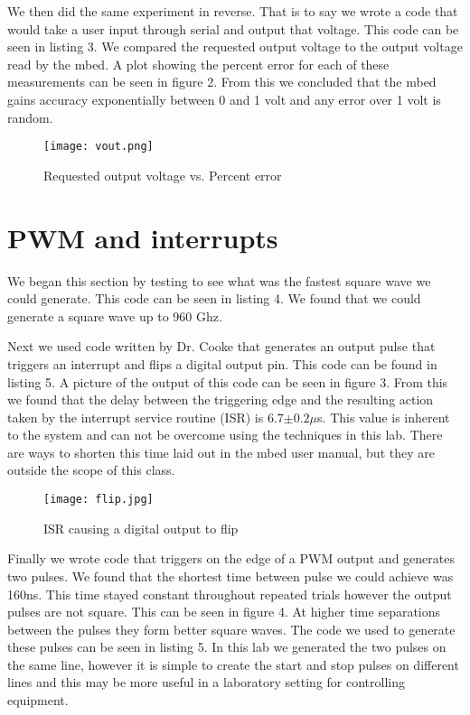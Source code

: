 \documentclass[prl,12pt,notitlepage,aps,onecolumn,superscriptaddress]{revtex4-1}
\begin{document}
We then did the same experiment in reverse. That is to say we wrote a code that would take a user input through serial and output that voltage. This code can be seen in listing 3. We compared the requested output voltage to the output voltage read by the mbed. A plot showing the percent error for each of these measurements can be seen in figure 2. From this we concluded that the mbed gains accuracy exponentially between 0 and 1 volt and any error over 1 volt is random.


\begin{figure}[h]
\begin{center}
\texttt{[image: vout.png]}
\end{center}
\caption{\label{fig:pic} Requested output voltage vs. Percent error}
\end{figure}


\section{PWM and interrupts}
We began this section by testing to see what was the fastest square wave we could generate. This code can be seen in listing 4. We found that we could generate a square wave up to 960 Ghz.


Next we used code written by Dr. Cooke that generates an output pulse that triggers an interrupt and flips a digital output pin. This code can be found in listing 5. A picture of the output of this code can be seen in figure 3. From this we found that the delay between the triggering edge and the resulting action taken by the interrupt service routine (ISR) is 6.7$\pm0.2\mu$s. This value is inherent to the system and can not be overcome using the techniques in this lab. There are ways to shorten this time laid out in the mbed user manual, but they are outside the scope of this class.


\begin{figure}[h]
\begin{center}
\texttt{[image: flip.jpg]}
\end{center}
\caption{\label{fig:pic} ISR causing a digital output to flip}
\end{figure}


Finally we wrote code that triggers on the edge of a PWM output and generates two pulses. We found that the shortest time between pulse we could achieve was 160ns. This time stayed constant throughout repeated trials however the output pulses are not square. This can be seen in figure 4. At higher time separations between the pulses they form better square waves. The code we used to generate these pulses can be seen in listing 5. In this lab we generated the two pulses on the same line, however it is simple to create the start and stop pulses on different lines and this may be more useful in a laboratory setting for controlling equipment.
\end{document}
